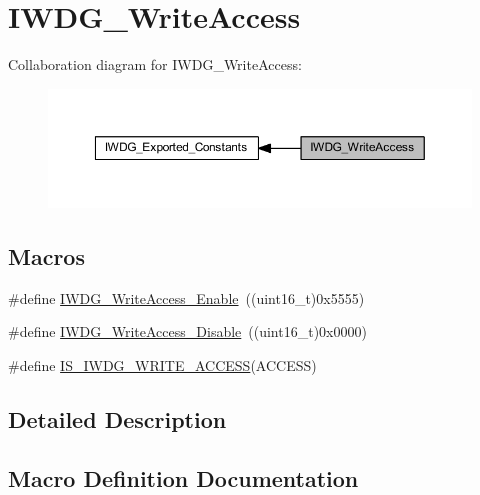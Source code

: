 \hypertarget{group___i_w_d_g___write_access}{}\section{I\+W\+D\+G\+\_\+\+Write\+Access}
\label{group___i_w_d_g___write_access}
Collaboration diagram for I\+W\+D\+G\+\_\+\+Write\+Access\+:
\nopagebreak
\begin{figure}[H]
\begin{center}
\leavevmode
\includegraphics[width=350pt]{group___i_w_d_g___write_access}
\end{center}
\end{figure}
\subsection*{Macros}
\begin{DoxyCompactItemize}
\item 
\#define \hyperlink{group___i_w_d_g___write_access_ga86f4b926f4351e19ea069f98c2e65f91}{I\+W\+D\+G\+\_\+\+Write\+Access\+\_\+\+Enable}~((uint16\+\_\+t)0x5555)
\item 
\#define \hyperlink{group___i_w_d_g___write_access_ga4b395cf5b2d7ab18fc71a5f779f758cc}{I\+W\+D\+G\+\_\+\+Write\+Access\+\_\+\+Disable}~((uint16\+\_\+t)0x0000)
\item 
\#define \hyperlink{group___i_w_d_g___write_access_gaa89c93332f5977175f8d416b7492de18}{I\+S\+\_\+\+I\+W\+D\+G\+\_\+\+W\+R\+I\+T\+E\+\_\+\+A\+C\+C\+E\+SS}(A\+C\+C\+E\+SS)
\end{DoxyCompactItemize}


\subsection{Detailed Description}


\subsection{Macro Definition Documentation}
\mbox{\label{group___i_w_d_g___write_access_gaa89c93332f5977175f8d416b7492de18}} 
